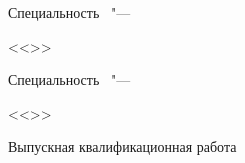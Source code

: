 \thispagestyle{empty}
\begin{center}
\thesisOrganization
\end{center}
%
\vspace{0pt plus4fill} %
%
%
\vspace{0pt plus6fill} %
\begin{center}
{\large \thesisAuthor}
\end{center}
%
\vspace{0pt plus1fill} %
\begin{center}
\textbf {\large %
\thesisTitle}

\vspace{0pt plus2fill} %
{%
Специальность \thesisSpecialtyNumber\ "---

<<\thesisSpecialtyTitle>>
}

\ifdefined\thesisSpecialtyTwoNumber
{%
Специальность \thesisSpecialtyTwoNumber\ "--- 

<<\thesisSpecialtyTwoTitle>>
}
\fi

\vspace{0pt plus2fill} %
Выпускная квалификационная работа

\thesisDegree
\end{center}
